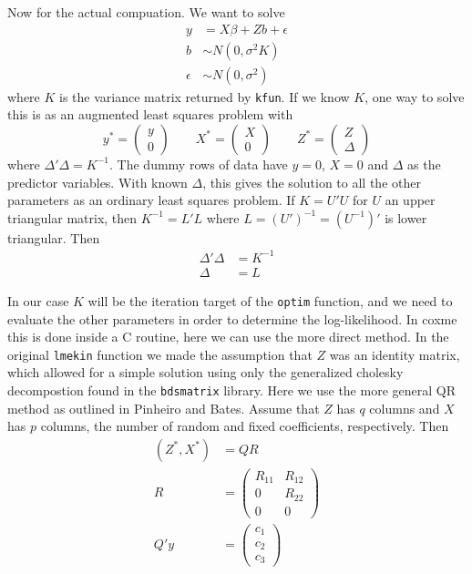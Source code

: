 \documentclass{article}
\begin{document}
Now for the actual compuation.
We want to solve
\begin{align*}
  y & = X\beta + Zb + \epsilon \\
  b & \sim N(0, \sigma^2K) \\
  \epsilon &\sim N(0, \sigma^2)
\end{align*}
where $K$ is the variance matrix returned by \Verb!kfun!.
If we know $K$, one way to solve this is as an augmented
least squares problem with
\begin{equation*}
  y^*=\left(\begin{array}{c} y\\0 \end{array} \right) \qquad
  X^*=\left(\begin{array}{c} X\\0 \end{array} \right) \qquad
  Z^*=\left(\begin{array}{c} Z\\ \Delta  \end{array} \right)
\end{equation*}
where $\Delta' \Delta= K^{-1}$.                     
The dummy rows of data have $y=0$, $X=0$ and $\Delta$ as
the predictor variables.
With known $\Delta$, this gives the solution to all the other
parameters as an ordinary least squares problem.
If $K= U'U$ for $U$ an upper triangular matrix, then 
$K^{-1} = L'L$ where $L= (U')^{-1}= (U^{-1})'$ is lower triangular.
Then 
\begin{align}
  \Delta' \Delta &= K^{-1} \nonumber \\
 \Delta &= L \label{eq:delta}
\end{align}

In our case $K$ will be the iteration target of the
\Verb!optim! function, and we need to 
evaluate the other parameters in order to determine the log-likelihood.
In coxme this is done inside a C routine, here we can use the
more direct method.
In the original \Verb!lmekin! function we made the assumption that
$Z$ was an identity matrix, which allowed for a simple solution
using only the generalized cholesky decompostion found in the
\Verb!bdsmatrix! library.
Here we use the more general QR method as outlined in Pinheiro and
Bates.  
Assume that $Z$ has $q$ columns and $X$ has $p$ columns, the number
of random and fixed coefficients, respectively.
Then
\begin{align*}
  \left(Z^*, X^* \right) &= QR \\
  R &= \left( \begin{array}{cc} R_{11}& R_{12} \\ 0& R_{22} \\
                                0 & 0
    \end{array} \right) \\
  Q'y &= \left( \begin{array}{c} c_1 \\ c_2 \\ c_3 \end{array} \right)
\end{align*}                                                         %
\end{document}
